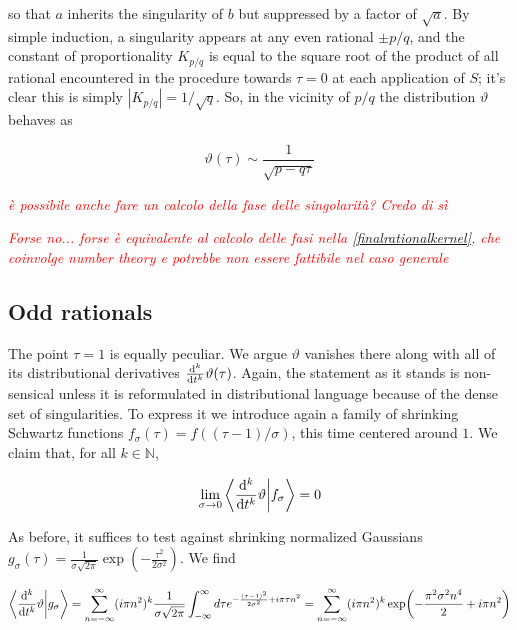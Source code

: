 \documentclass{article}
\newcommand{\cmnt}[1]{\textcolor{red}{\emph{#1}}}
\newcommand{\intR}{\int_{-\infty}^\infty}
\newcommand{\sumZ}{\sum_{n=-\infty}^{\infty}}
\begin{document}
so that $a$ inherits the singularity of $b$ but suppressed by a factor of $\sqrt{a}$. By simple induction, a singularity appears at any even rational $\pm p/q$, and the constant of proportionality $K_{p/q}$ is equal to the square root of the product of all rational encountered in the procedure towards $\tau = 0$ at each application of $S$; it's clear this is simply $|K_{p/q}| = 1/\sqrt{q}$. So, in the vicinity of $p/q$ the distribution $\vartheta$ behaves as

\begin{equation}
    \vartheta(\tau) \sim \frac{1}{\sqrt{p-q\tau}}
\end{equation}

\cmnt{è possibile anche fare un calcolo della fase delle singolarità? Credo di sì}

\cmnt{Forse no... forse è equivalente al calcolo delle fasi nella \eqref{finalrationalkernel}, che coinvolge number theory e potrebbe non essere fattibile nel caso generale}

\subsection{Odd rationals}

The point $\tau=1$ is equally peculiar. We argue $\vartheta$ vanishes there along with all of its distributional derivatives $\dv[k]{t} \vartheta(\tau)$. Again, the statement as it stands is non-sensical unless it is reformulated in distributional language because of the dense set of singularities. To express it we introduce again a family of shrinking Schwartz functions $f_\sigma(\tau) = f((\tau-1)/\sigma)$, this time centered around $1$. We claim that, for all $k \in \mathbb{N}$,

\begin{equation}
    \lim_{\sigma \rightarrow 0} \bra{ \dv[k]{t}\vartheta}\ket{ f_\sigma } = 0
\end{equation}

As before, it suffices to test against shrinking normalized Gaussians $g_\sigma(\tau) = \frac{1}{\sigma\sqrt{2\pi}} \exp( - \frac{\tau^2}{2\sigma^2} )$. We find

\begin{equation}
    \bra{\dv[k]{t}\vartheta}\ket{g_\sigma} = \sumZ (i\pi n^2)^k \frac{1}{\sigma\sqrt{2\pi}} \intR d\tau e^{- \frac{(\tau-1)^2}{2\sigma^2} + i\pi\tau n^2} = \sumZ (i\pi n^2)^k \exp( - \frac{\pi^2 \sigma^2 n^4}{2} + i\pi n^2)
\end{equation}
\end{document}
